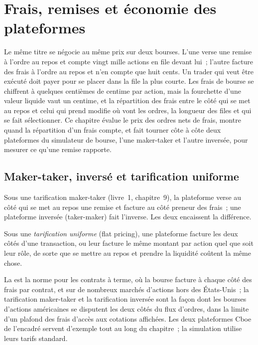 \chapter{Frais, remises et économie des plateformes}\label{ch:mx:fees-rebates-and-venue-economics}

Le même titre se négocie au même prix sur deux bourses. L'une verse une remise à l'ordre au repos et compte vingt mille actions en file devant lui~; l'autre
facture des frais à l'ordre au repos et n'en compte que huit cents. Un trader qui veut être exécuté doit payer pour se placer dans la file la plus courte. Les frais de bourse se chiffrent à quelques
centièmes de centime par action, mais la fourchette d'une valeur liquide vaut un centime, et la répartition des frais entre le côté qui se met au repos et celui qui prend
modifie où vont les ordres, la longueur des files et qui se fait sélectionner. Ce chapitre évalue le prix des ordres nets de frais, montre quand la répartition d'un frais compte,
et fait tourner côte à côte deux plateformes du simulateur de bourse, l'une maker-taker et l'autre inversée, pour mesurer ce qu'une remise rapporte.

\section{Maker-taker, inversé et tarification uniforme}

Sous une tarification maker-taker (livre~1, chapitre~9), la plateforme verse au côté qui se met au repos une remise et facture au côté preneur des frais~; une plateforme inversée
(taker-maker) fait l'inverse. Les deux encaissent la différence.

\begin{definition}\label{def:mx:fees-rebates-and-venue-economics:flat}
Sous une \emph{tarification uniforme} (flat pricing), une plateforme facture les deux côtés d'une transaction, ou leur facture le même montant par action quel que soit leur rôle,
de sorte que se mettre au repos et prendre la liquidité coûtent la même chose.
\end{definition}

La  est la norme pour les contrats à terme, où la bourse facture à chaque côté des frais par contrat, et sur de nombreux marchés d'actions hors des
États-Unis~; la tarification maker-taker et la tarification inversée sont la façon dont les bourses d'actions américaines se disputent les deux côtés du flux d'ordres, dans la limite d'un plafond des frais d'accès aux
cotations affichées. Les deux plateformes Cboe de l'encadré servent d'exemple tout au long du chapitre~; la simulation utilise leurs tarifs standard.

